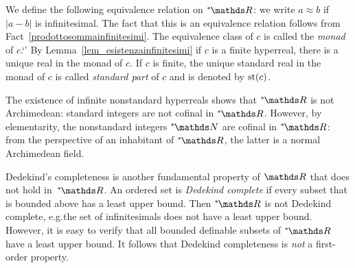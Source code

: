We define the following equivalence relation on $\nsR$: we write \emph{$a\approx b$\/} if $|a-b|$ is infinitesimal.
The fact that this is an equivalence relation follows from Fact~\ref{prodottosommainfinitesimi}.
The equivalence class of $c$ is called the \emph{monad\/} of $c$.`'
By Lemma~\ref{lem_esistenzainfinitesimi} if $c$ is a finite hyperreal, there is a unique real in the monad of $c$.
If $c$ is finite, the unique standard real in the monad of $c$ is called \emph{standard part\/} of $c$ and is denoted by \emph{${\rm st}(c)$.}

The existence of infinite nonstandard hyperreals shows that $\nsR$ is not Archimedean: standard integers are not cofinal in $\nsR$.
However, by elementarity, the nonstandard integers $\nsN$ are cofinal in $\nsR$: from the perspective of an inhabitant of $\nsR$, the latter is a normal Archimedean field.

Dedekind's completeness is another fundamental property of $\RR$ that does not hold in~$\nsR$.
An ordered set is \emph{Dedekind complete} if every subset that is bounded above has a least upper bound.
Then $\nsR$ is not Dedekind complete, e.g.\@ the set of infinitesimals does not have a least upper bound.
However, it is easy to verify that all bounded definable subsets of $\nsR$ have a least upper bound.
It follows that Dedekind completeness is \textit{not\/} a first-order property.
 








